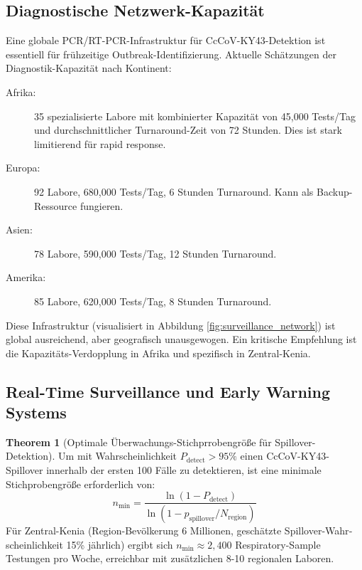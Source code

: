 \documentclass[11pt,a4paper]{article}
\theoremstyle{definition}
\newtheorem{theorem}{Theorem}[section]
\begin{document}
\subsection{Diagnostische Netzwerk-Kapazität}

Eine globale PCR/RT-PCR-Infrastruktur für CcCoV-KY43-Detektion ist essentiell für frühzeitige Outbreak-Identifizierung. Aktuelle Schätzungen der Diagnostik-Kapazität nach Kontinent:

\begin{description}
\item[Afrika:] 35 spezialisierte Labore mit kombinierter Kapazität von 45,000 Tests/Tag und durchschnittlicher Turnaround-Zeit von 72 Stunden. Dies ist stark limitierend für rapid response.

\item[Europa:] 92 Labore, 680,000 Tests/Tag, 6 Stunden Turnaround. Kann als Backup-Ressource fungieren.

\item[Asien:] 78 Labore, 590,000 Tests/Tag, 12 Stunden Turnaround.

\item[Amerika:] 85 Labore, 620,000 Tests/Tag, 8 Stunden Turnaround.
\end{description}

Diese Infrastruktur (visualisiert in Abbildung \ref{fig:surveillance_network}) ist global ausreichend, aber geografisch unausgewogen. Ein kritische Empfehlung ist die Kapazitäts-Verdopplung in Afrika und spezifisch in Zentral-Kenia.

\subsection{Real-Time Surveillance und Early Warning Systems}

\begin{theorem}[Optimale Überwachungs-Stichprrobengröße für Spillover-Detektion]
\label{thm:surveillance_sampling}
Um mit Wahrscheinlichkeit $P_{\text{detect}} > 95\%$ einen CcCoV-KY43-Spillover innerhalb der ersten 100 Fälle zu detektieren, ist eine minimale Stichprobengröße erforderlich von:
\[
n_{\text{min}} = \frac{\ln(1 - P_{\text{detect}})}{\ln(1 - p_{\text{spillover}}/N_{\text{region}})}
\]
Für Zentral-Kenia (Region-Bevölkerung 6 Millionen, geschätzte Spillover-Wahr­schein­lichkeit 15\% jährlich) ergibt sich $n_{\text{min}} \approx 2,400$ Respiratory-Sample Testungen pro Woche, erreichbar mit zusätzlichen 8-10 regionalen Laboren.
\end{theorem}
\end{document}
